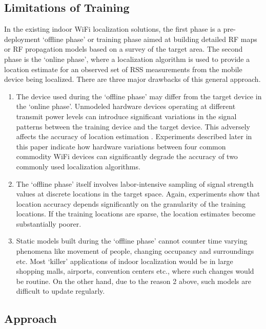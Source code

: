 \subsection{Limitations of Training}
\label{subsec:limitationsoftraining}

In the existing indoor WiFi localization solutions, the first phase is a pre-deployment `offline phase' or training phase aimed at building detailed RF maps or RF propagation models based on a survey of the target area. The second phase is the `online phase', where a localization algorithm is used to provide a location estimate for an observed set of RSS measurements from the mobile device being localized. There are three major drawbacks of this general approach. 
\begin{enumerate}
\item
The device used during the `offline phase' may differ from the target device in the `online phase'. Unmodeled hardware devices operating at different transmit power levels can introduce significant variations in the signal patterns between the training device and the target device. This adversely affects the accuracy of location estimation \cite{Tsui:2009:ULS:1741410.1741596}. Experiments described later in this paper indicate how hardware variations between four common commodity WiFi devices can significantly degrade the accuracy of two commonly used localization algorithms. 
\item
The `offline phase' itself involves labor-intensive sampling of signal strength values at discrete locations in the target space. Again, experiments show that location accuracy depends significantly on the granularity of the training locations. If the training locations are sparse, the location estimates become substantially poorer.
\item
Static models built during the `offline phase' cannot counter time varying phenomena like movement of people, changing occupancy and surroundings etc. Most 
`killer' applications of indoor localization would be in large shopping malls, airports, 
convention centers etc., where such changes would be routine. 
On the other hand, due to the reason 2 above, such models are difficult to update regularly. 
\end{enumerate}

\subsection{Approach}

